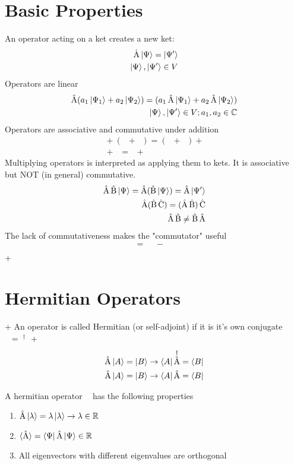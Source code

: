 \documentclass[10pt,a4paper]{book}
\DeclareMathOperator {\opA} {\hat{A}}
\DeclareMathOperator {\opB} {\hat{B}}
\DeclareMathOperator {\opC} {\hat{C}}
\begin{document}
\section{Basic Properties}
An operator acting on a ket creates a new ket:
\begin{align}
	\opA \ket{\Psi} = \ket{\Psi'} \\
	\ket{\Psi}, \ket{\Psi'} \in V
\end{align}
Operators are linear
\begin{align}
	\opA (a_1\ket{\Psi_1} + a_2\ket{\Psi_2}) = (a_1\opA\ket{\Psi_1} + a_2\opA\ket{\Psi_2}) \\
	\ket{\Psi}, \ket{\Psi'} \in V; a_1, a_2 \in \mathbb{C}
\end{align}
Operators are associative and commutative under addition
\begin{align}
	\opA + (\opB + \opC) = (\opA + \opB) + \opC \\
	\opA + \opB = \opB + \opA
\end{align}
Multiplying operators is interpreted as applying them to kets. It is associative but NOT (in general) commutative.
\begin{align}
	\opA\opB\ket{\Psi} = \opA(\opB\ket{\Psi}) = \opA\ket{\Psi'} \\
	\opA(\opB\opC) = (\opA\opB)\opC                             \\
	\opA\opB \ne \opB\opA
\end{align}
The lack of commutativeness makes the "commutator" useful
\begin{align}
	[\opA, \opB] = \opA\opB - \opB\opA \\
\end{align}
+    \section{Hermitian Operators}
+    An operator is called Hermitian (or self-adjoint) if it is it's own conjugate $\opA = \opA^\dagger$
+
\begin{align}
	\opA\ket{A} = \ket{B} \rightarrow \bra{A}\opA^\dagger = \bra{B} \\
	\opA\ket{A} = \ket{B} \rightarrow \bra{A}\opA = \bra{B}         \\
\end{align}

A hermitian operator $\opA$ has the following properties
\begin{enumerate}
	\item $\opA\ket{\lambda} = \lambda \ket{\lambda} \rightarrow \lambda \in \mathbb{R}$
	\item $\braket{\opA} = \bra{\Psi}\opA\ket{\Psi} \in \mathbb{R}$
	\item All eigenvectors with different eigenvalues are orthogonal
\end{enumerate}
\end{document}
